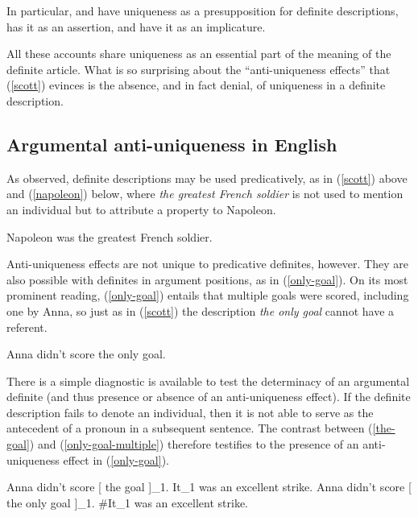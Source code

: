 In particular, \citet{frege} and \citet{strawson50} have uniqueness as a presupposition for definite descriptions, \citet{russell} has it as an assertion, and \citet{horn-abbott-2012} have it as an implicature.

All these accounts share uniqueness as an essential part of the meaning of the definite article. What is so surprising about the ``anti-uniqueness effects'' that (\ref{scott}) evinces is the absence, and in fact denial, of uniqueness in a definite description.

\subsection{Argumental anti-uniqueness in English}
As \citet{strawson50} observed, definite descriptions may be used predicatively, as in (\ref{scott}) above and (\ref{napoleon}) below, where \textit{the greatest French soldier} is not used to mention an individual but to attribute a property to Napoleon.

\begin{exe}
	\ex \label{napoleon} Napoleon was the greatest French soldier.
\end{exe}

Anti-uniqueness effects are not unique to predicative definites, however. They are also possible with definites in argument positions, as in (\ref{only-goal}). On its most prominent reading, (\ref{only-goal}) entails that multiple goals were scored, including one by Anna, so just as in (\ref{scott}) the description \textit{the only goal} cannot have a referent.

\begin{exe}
	\ex \label{only-goal} Anna didn't score the only goal.
\end{exe}

There is a simple diagnostic is available to test the determinacy of an argumental definite (and thus presence or absence of an anti-uniqueness effect). If the definite description fails to denote an individual, then it is not able to serve as the antecedent of a pronoun in a subsequent sentence. The contrast between (\ref{the-goal}) and (\ref{only-goal-multiple}) therefore testifies to the presence of an anti-uniqueness effect in (\ref{only-goal}).

\begin{exe}
	\ex \label{the-goal} Anna didn't score [ the goal ]_1. It_1 was an excellent strike.
	\ex \label{only-goal-multiple} Anna didn't score [ the only goal ]_1. \#It_1 was an excellent strike.
\end{exe}


